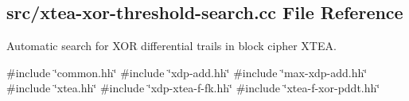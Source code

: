 \hypertarget{xtea-xor-threshold-search_8cc}{\subsection{src/xtea-\/xor-\/threshold-\/search.cc \-File \-Reference}
\label{xtea-xor-threshold-search_8cc}
}


\-Automatic search for \-X\-O\-R differential trails in block cipher \-X\-T\-E\-A.  


{\ttfamily \#include \char`\"{}common.\-hh\char`\"{}}\*
{\ttfamily \#include \char`\"{}xdp-\/add.\-hh\char`\"{}}\*
{\ttfamily \#include \char`\"{}max-\/xdp-\/add.\-hh\char`\"{}}\*
{\ttfamily \#include \char`\"{}xtea.\-hh\char`\"{}}\*
{\ttfamily \#include \char`\"{}xdp-\/xtea-\/f-\/fk.\-hh\char`\"{}}\*
{\ttfamily \#include \char`\"{}xtea-\/f-\/xor-\/pddt.\-hh\char`\"{}}\*
